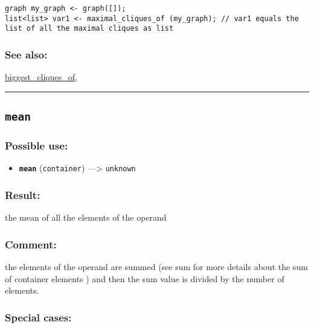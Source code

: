 \documentclass[]{book}
\providecommand{\tightlist}{%
  \setlength{\itemsep}{0pt}\setlength{\parskip}{0pt}}
\theoremstyle{definition}
\theoremstyle{definition}
\theoremstyle{definition}
\theoremstyle{remark}
\begin{document}
\begin{verbatim}
graph my_graph <- graph([]);  
list<list> var1 <- maximal_cliques_of (my_graph); // var1 equals the list of all the maximal cliques as list
\end{verbatim}

\subsubsection{See also:}\label{see-also-136}

\href{OperatorsBC\#biggest_cliques_of}{biggest\_cliques\_of},

\begin{center}\rule{0.5\linewidth}{\linethickness}\end{center}

\subsection{\texorpdfstring{\texttt{mean}}{mean}}\label{mean}

\subsubsection{Possible use:}\label{possible-use-343}

\begin{itemize}
\tightlist
\item
  \textbf{\texttt{mean}} (\texttt{container}) ---\textgreater{}
  \texttt{unknown}
\end{itemize}

\subsubsection{Result:}\label{result-332}

the mean of all the elements of the operand

\subsubsection{Comment:}\label{comment-67}

the elements of the operand are summed (see sum for more details about
the sum of container elements ) and then the sum value is divided by the
number of elements.

\subsubsection{Special cases:}\label{special-cases-95}
\end{document}
